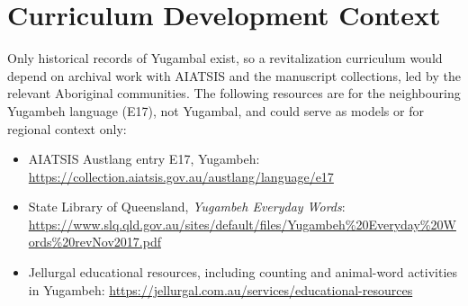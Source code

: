 \documentclass[12pt]{article}
\begin{document}
\section{Curriculum Development Context}
Only historical records of Yugambal exist, so a revitalization curriculum would depend on archival work with AIATSIS and the manuscript collections, led by the relevant Aboriginal communities. The following resources are for the neighbouring Yugambeh language (E17), not Yugambal, and could serve as models or for regional context only:
\begin{itemize}
\item AIATSIS Austlang entry E17, Yugambeh: \url{https://collection.aiatsis.gov.au/austlang/language/e17}
\item State Library of Queensland, \emph{Yugambeh Everyday Words}: \url{https://www.slq.qld.gov.au/sites/default/files/Yugambeh%20Everyday%20Words%20revNov2017.pdf}
\item Jellurgal educational resources, including counting and animal-word activities in Yugambeh: \url{https://jellurgal.com.au/services/educational-resources}
\end{itemize}
\end{document}
